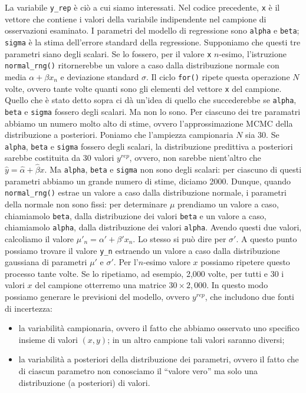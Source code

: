 \documentclass[
  11pt,
]{krantz}
\providecommand{\tightlist}{%
  \setlength{\itemsep}{0pt}\setlength{\parskip}{0pt}}
\theoremstyle{definition}
\theoremstyle{definition}
\theoremstyle{definition}
\theoremstyle{definition}
\theoremstyle{remark}
\begin{document}
La variabile \texttt{y\_rep} è ciò a cui siamo interessati. Nel codice precedente, \texttt{x} è il vettore che contiene i valori della variabile indipendente nel campione di osservazioni esaminato. I parametri del modello di regressione sono \texttt{alpha} e \texttt{beta}; \texttt{sigma} è la stima dell'errore standard della regressione. Supponiamo che questi tre parametri siano degli scalari. Se lo fossero, per il valore \texttt{x} \(n\)-esimo, l'istruzione \texttt{normal\_rng()} ritornerebbe un valore a caso dalla distribuzione normale con media \(\alpha + \beta x_n\) e deviazione standard \(\sigma\). Il ciclo \texttt{for()} ripete questa operazione \(N\) volte, ovvero tante volte quanti sono gli elementi del vettore \texttt{x} del campione. Quello che è stato detto sopra ci dà un'idea di quello che succederebbe se \texttt{alpha}, \texttt{beta} e \texttt{sigma} fossero degli scalari. Ma non lo sono. Per ciascuno dei tre paramatri abbiamo un numero molto alto di stime, ovvero l'approssimazione MCMC della distribuzione a posteriori. Poniamo che l'ampiezza campionaria \(N\) sia 30. Se \texttt{alpha}, \texttt{beta} e \texttt{sigma} fossero degli scalari, la distribuzione predittiva a posteriori sarebbe costituita da 30 valori \(y^{rep}\), ovvero, non sarebbe nient'altro che \(\hat{y} = \hat{\alpha} + \hat{\beta} x\). Ma \texttt{alpha}, \texttt{beta} e \texttt{sigma} non sono degli scalari: per ciascuno di questi parametri abbiamo un grande numero di stime, diciamo 2000. Dunque, quando \texttt{normal\_rng()} estrae un valore a caso dalla distribuzione normale, i parametri della normale non sono fissi: per determinare \(\mu\) prendiamo un valore a caso, chiamiamolo \texttt{beta\textquotesingle{}}, dalla distribuzione dei valori \texttt{beta} e un valore a caso, chiamiamolo \texttt{alpha\textquotesingle{}}, dalla distribuzione dei valori \texttt{alpha}. Avendo questi due valori, calcoliamo il valore \(\mu'_n = \alpha' + \beta' x_n\). Lo stesso si può dire per \(\sigma'\). A questo punto possiamo trovare il valore \texttt{y\_n\textquotesingle{}} estraendo un valore a caso dalla distribuzione gaussiana di parametri \(\mu'\) e \(\sigma'\). Per l'\(n\)-esimo valore \(x\) possiamo ripetere questo processo tante volte. Se lo ripetiamo, ad esempio, 2,000 volte, per tutti e 30 i valori \(x\) del campione otterremo una matrice \(30 \times 2,000\). In questo modo possiamo generare le previsioni del modello, ovvero \(y^{rep}\), che includono due fonti di incertezza:

\begin{itemize}
\tightlist
\item
  la variabilità campionaria, ovvero il fatto che abbiamo osservato uno specifico insieme di valori \((x, y)\); in un altro campione tali valori saranno diversi;
\item
  la variabilità a posteriori della distribuzione dei parametri, ovvero il fatto che di ciascun parametro non conosciamo il ``valore vero'' ma solo una distribuzione (a posteriori) di valori.
\end{itemize}
\end{document}
